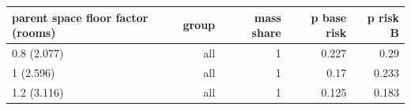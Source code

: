 \begin{tabular}{lrrrr}
\toprule
parent space floor factor (rooms) & group & mass share & p base risk & p risk B \\
\midrule
0.8 (2.077) & all & 1 & 0.227 & 0.29 \\
1 (2.596) & all & 1 & 0.17 & 0.233 \\
1.2 (3.116) & all & 1 & 0.125 & 0.183 \\
\bottomrule
\end{tabular}
